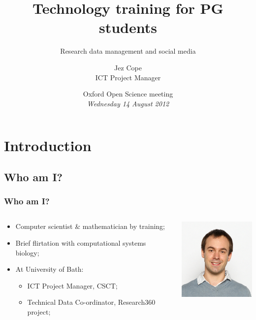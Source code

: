 \documentclass{beamer}
\title{Technology training for PG students}
\subtitle{Research data management and social media}
\author[Jez Cope]{Jez Cope\\ ICT Project Manager}
\institute[Bath]{Centre for Sustainable Chemical Technologies\\ University of Bath}
\date[22 August 2012]{Oxford Open Science meeting\\ \textit{Wednesday 14 August 2012}}
\begin{document}

\begin{frame}[plain]
  \titlepage
\end{frame}

\begin{frame}
  \tableofcontents
\end{frame}

\section{Introduction}

\subsection{Who am I?}

\begin{frame}
  \frametitle{Who am I?}
  
  \begin{columns}
    \begin{column}{6cm}
      \begin{itemize}
        \item Computer scientist \& mathematician by training;
        \item Brief flirtation with computational systems biology;
        \item At University of Bath:
          \begin{itemize}
            \item ICT Project Manager, CSCT;
            \item Technical Data Co-ordinator, Research360 project;
          \end{itemize}
      \end{itemize}
    \end{column}
    \begin{column}{4cm}
      \includegraphics[width=4cm]{COPE_Jez}
    \end{column}
  \end{columns}
\end{frame}
\end{document}

